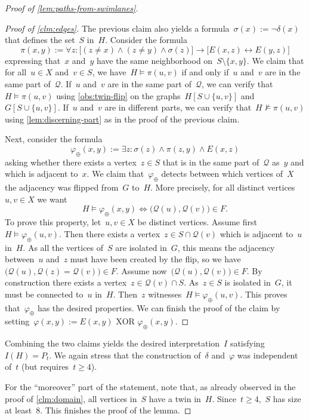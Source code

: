 \documentclass[11pt]{article}      \usepackage[margin=1in]{geometry}  \usepackage{microtype}
\theoremstyle{definition}
\renewcommand{\phi}{\varphi}
\newcommand{\QQ}{\mathcal{Q}}
\renewcommand{\ge}{\geqslant}
\renewcommand{\geq}{\ge}
\newenvironment{claimproof}[1][\proofname]{\renewcommand{\qedsymbol}{$\blacksquare$}\begin{proof}[#1]}{\end{proof}}
\begin{document}
\begin{proof}[Proof of \cref{lem:paths-from-swimlanes}]
    \begin{claimproof}[Proof of \cref{clm:edges}]
        The previous claim also yields a formula~$\sigma(x):=\neg\delta(x)$ that defines the set~$S$ in~$H$. Consider the formula 
        \[
            \pi(x,y) := \forall z : \big[(z \neq x) \wedge (z \neq y) \wedge \sigma(z)\big] \rightarrow \big[E(x,z) \leftrightarrow E(y,z)\big]   
        \]
        expressing that~$x$ and~$y$ have the same neighborhood on~$S \setminus \{x,y\}$.
        We claim that for all~$u \in X$ and~$v \in S$, we have~$H \models \pi(u,v)$ if and only if~$u$ and~$v$ are in the same part of~$\QQ$.
        If~$u$ and~$v$ are in the same part of~$\QQ$, we can verify that~$H \models \pi(u,v)$ using \cref{obs:twin-flip} on the graphs~$H[S \cup \{u,v\}]$ and~$G[S \cup \{u,v\}]$.
        If~$u$ and~$v$ are in different parts, we can verify that~$H \not\models \pi(u,v)$ using \cref{lem:discerning-part} as in the proof of the previous claim.
        
        Next, consider the formula 
        \[
            \phi_\oplus(x,y) := \exists z: \sigma(z) \wedge \pi(z,y) \wedge E(x,z)
        \]
        asking whether there exists a vertex~$z\in S$ that is in the same part of~$\QQ$ as~$y$ and which is adjacent to~$x$.
        We claim that~$\phi_\oplus$ detects between which vertices of~$X$ the adjacency was flipped from~$G$ to~$H$.
        More precisely, for all distinct vertices~$u,v \in X$ we want 
        \[
            H \models \phi_\oplus (x,y) \Leftrightarrow \big(\QQ(u), \QQ(v)\big) \in F.
        \]
        To prove this property, let~$u,v \in X$ be distinct vertices.
        Assume first~$H\models \phi_\oplus(u,v)$. Then there exists a vertex~$z\in S \cap \QQ(v)$ which is adjacent to~$u$ in~$H$.
        As all the vertices of~$S$ are isolated in~$G$, this means the adjacency between~$u$ and~$z$ must have been created by the flip, so we have
       ~$\big(\QQ(u), \QQ(z) = \QQ(v)\big) \in F$.
        Assume now~$\big(\QQ(u), \QQ(v)\big) \in F$.
        By construction there exists a vertex~$z \in \QQ(v) \cap S$.
        As~$z \in S$ is isolated in~$G$, it must be connected to~$u$ in~$H$.
        Then~$z$ witnesses~$H \models \phi_\oplus(u,v)$.
        This proves that~$\phi_\oplus$ has the desired properties.
        We can finish the proof of the claim by setting~$\phi(x,y) := E(x,y) \text{ XOR } \phi_\oplus(x,y)$.
    \end{claimproof}
    Combining the two claims yields the desired interpretation~$I$ satisfying~$I(H) = P_t$.
    We again stress that the construction of~$\delta$ and~$\phi$ was independent of~$t$ (but requires~$t\geq 4$).

    For the ``moreover'' part of the statement, note that, as already observed in the proof of \cref{clm:domain}, all vertices in~$S$ have a twin in~$H$.
    Since~$t\geq 4$,~$S$ has size at least~$8$.
    This finishes the proof of the lemma.
\end{proof}
\end{document}
